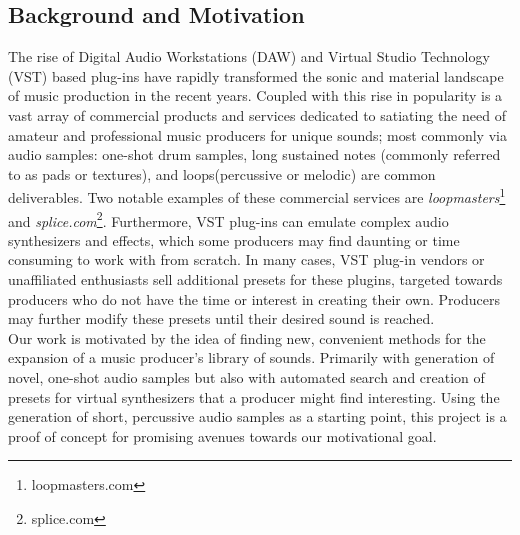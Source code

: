 \documentclass{nime-alternate} %
\begin{document}
\subsection{Background and Motivation}
The rise of Digital Audio Workstations (DAW) \cite{leider2004digital} and Virtual Studio Technology (VST) based plug-ins \cite{tanev2013virtual} have rapidly transformed the sonic and material landscape of music production in the recent years. Coupled with this rise in popularity is a vast array of commercial products and services dedicated to satiating the need of amateur and professional music producers for unique sounds; most commonly via audio samples: one-shot drum samples, long sustained notes (commonly referred to as pads or textures), and loops(percussive or melodic) are common deliverables. Two notable examples of these commercial services are \textit{loopmasters}\footnote{loopmasters.com} and \textit{splice.com}\footnote{splice.com}. Furthermore, VST plug-ins can emulate complex audio synthesizers and effects, which some producers may find daunting or time consuming to work with from scratch. In many cases, VST plug-in vendors or unaffiliated enthusiasts sell additional presets for these plugins, targeted towards producers who do not have the time or interest in creating their own. Producers may further modify these presets until their desired sound is reached.\\
Our work is motivated by the idea of finding new, convenient methods for the expansion of a music producer's library of sounds. Primarily with generation of novel, one-shot audio samples but also with automated search and creation of presets for virtual synthesizers that a producer might find  interesting. Using the generation of short, percussive audio samples as a starting point, this project is a proof of concept for promising avenues towards our motivational goal.\\
\end{document}
